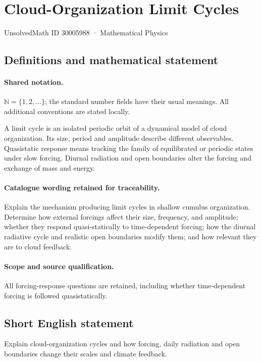\documentclass[11pt]{article}
\begin{document}
\setcounter{section}{30005987}
\section{Cloud-Organization Limit Cycles}\label{30005988}
{\small UnsolvedMath ID 30005988 · Mathematical Physics}
\subsection{Definitions and mathematical statement}

\paragraph{Shared notation.}$\mathbb N=\{1,2,\ldots\}$; the standard number fields have their usual meanings. All additional conventions are stated locally.


A limit cycle is an isolated periodic orbit of a dynamical model of cloud organization. Its size, period and amplitude describe different observables. Quasistatic response means tracking the family of equilibrated or periodic states under slow forcing. Diurnal radiation and open boundaries alter the forcing and exchange of mass and energy.

\paragraph{Catalogue wording retained for traceability.}
Explain the mechanism producing limit cycles in shallow cumulus organization. Determine how external forcings affect their size, frequency, and amplitude; whether they respond quasi-statically to time-dependent forcing; how the diurnal radiative cycle and realistic open boundaries modify them; and how relevant they are to cloud feedback.

\paragraph{Scope and source qualification.}All forcing-response questions are retained, including whether time-dependent forcing is followed quasistatically.
\subsection{Short English statement}
Explain cloud-organization cycles and how forcing, daily radiation and open boundaries change their scales and climate feedback.
\end{document}
